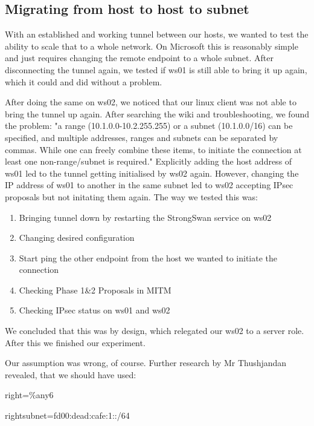\documentclass[a4paper]{report}
\begin{document}
\subsection{Migrating from host to host to subnet}
\label{ssec:MigHost}
With an established and working tunnel between our hosts, we wanted to test the ability to scale that to a whole network. On Microsoft this is reasonably simple and just requires changing the remote endpoint to a whole subnet. After disconnecting the tunnel again, we tested if ws01 is still able to bring it up again, which it could and did without a problem.

After doing the same on ws02, we noticed that our linux client was not able to bring the tunnel up again. After searching the wiki and troubleshooting, we found the problem: "a range (10.1.0.0-10.2.255.255) or a subnet (10.1.0.0/16) can be specified, and multiple addresses, ranges and subnets can be separated by commas. While one can freely combine these items, to initiate the connection at least one non-range/subnet is required." \parencite{Lang2017StrongSwan}
Explicitly adding the host address of ws01 led to the tunnel getting initialised by ws02 again. However, changing the IP address of ws01 to another in the same subnet led to ws02 accepting IPsec proposals but not initating them again. The way we tested this was:

\begin{enumerate}
	\item Bringing tunnel down by restarting the StrongSwan service on ws02
	\item Changing desired configuration
	\item Start ping the other endpoint from the host we wanted to initiate the connection
	\item Checking Phase 1\&2 Proposals in MITM
	\item Checking IPsec status on ws01 and ws02
\end{enumerate}

We concluded that this was by design, which relegated our ws02 to a server role. After this we finished our experiment.

Our assumption was wrong, of course. Further research by Mr Thushjandan revealed, that we should have used:

\begin{codebox}
	right=\%any6
	
	\noindent rightsubnet=fd00:dead:cafe:1::/64
\end{codebox}
\end{document}
